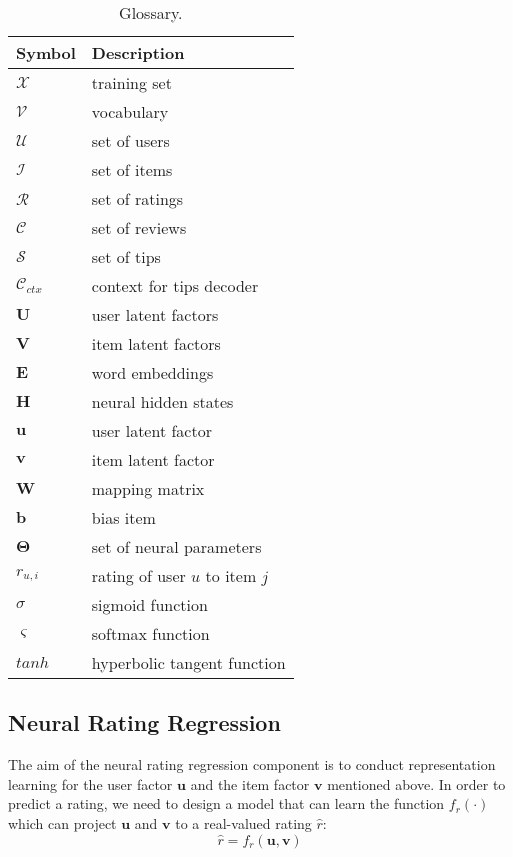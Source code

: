 \documentclass[sigconf]{acmart}
\begin{document}
\begin{table}[!t]
	\caption{Glossary.}
	\label{tbl:notations}
	\centering
	\begin{tabular}{p{1.3cm} p{4cm}}
		\hline
		Symbol & Description \\
		\hline
		$\mathcal{X}$ & training set\\
		$\mathcal{V}$ & vocabulary\\
		$\mathcal{U}$  & set of users \\
		$\mathcal{I}$  & set of items \\
		$\mathcal{R}$  & set of ratings \\
		$\mathcal{C}$  & set of reviews \\
		$\mathcal{S}$  & set of tips \\
		$\mathcal{C}_{ctx}$  & context for tips decoder \\
		$\mathbf{U}$  & user latent factors \\
		$\mathbf{V}$  & item latent factors \\
		$\mathbf{E}$  & word embeddings \\
		$\mathbf{H}$  & neural hidden states \\
		$\mathbf{u}$  & user latent factor \\
		$\mathbf{v}$  & item latent factor \\
		$\mathbf{W}$  & mapping matrix\\
		$\mathbf{b}$  & bias item \\
		$\mathbf{\Theta}$  & set of neural parameters\\
		$r_{u,i}$  & rating of user $u$ to item $j$ \\
		$\sigma$ & sigmoid function \\
		$\varsigma $ & softmax function \\
		$tanh$ &  hyperbolic tangent function \\
		\hline
	\end{tabular}
	\vspace{0mm}
\end{table}


\subsection{Neural Rating Regression}
\label{sec:rating-regression}

The aim of the neural rating regression component is to conduct representation learning for the user factor $\mathbf{u}$ and the item factor $\mathbf{v}$ mentioned above.
In order to predict a rating, we need to design a model that can learn the  function $f_r(\cdot)$ which can project $\mathbf{u}$  and  $\mathbf{v}$ to a real-valued rating $\hat r$:
\begin{equation}
{\hat r} = f_r(\mathbf{u}, \mathbf{v})
\end{equation}
\end{document}
